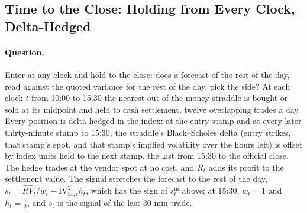 \subsection{Time to the Close: Holding from Every Clock, Delta-Hedged}
\label{sec:app_run_holdclose}

\paragraph{Question.} Enter at any clock and hold to the close: does a
forecast of the rest of the day, read against the quoted variance for the rest
of the day, pick the side? At each clock $t$ from 10:00 to 15:30 the nearest
out-of-the-money straddle is bought or sold at its midpoint and held to cash
settlement, twelve overlapping trades a day. Every position is delta-hedged in
the index: at the entry stamp and at every later thirty-minute stamp to 15:30,
the straddle's Black--Scholes delta (entry strikes, that stamp's spot, and that
stamp's implied volatility over the hours left) is offset by index units held
to the next stamp, the last from 15:30 to the official close. The hedge trades
at the vendor spot at no cost, and $R_t$ adds its profit to the settlement
value. The signal stretches the forecast to the rest of the day,
$s_t=\widehat{RV}_t/w_t-\mathrm{IV}^2_{\mathrm{hr},t}h_t$, which has the sign
of $s^{\mathrm m}_t$ above; at 15:30, $w_t=1$ and $h_t=\tfrac12$, and $s_t$ is
the signal of the last-30-min trade.

\begin{table}[H]
\centering
\caption{Holding to the close from every clock, delta-hedged, pooled over the
twelve entry clocks 10:00--15:30 (\runappHcNbars{} trades); columns as in
Table~\ref{tab:app_run_repick}. Each trade crosses the spread once, at entry.
The 15:30 leg column scores that leg alone at the crossed spread.}
\label{tab:app_run_holdclose}
\runappfit{\small}
\end{table}

\begin{table}[H]
\centering
\caption{The position against the outcome, by entry clock (midpoint, hedged
$R$). Accuracy is the share of days on which the position had the sign of
$R$: a buy with $R>0$ or a sale with $R\le 0$. The accuracy of always short is
$1-P(R>0)$. The bars with a censored implied volatility are left out.}
\label{tab:app_run_confusion}
\runappfit{\small}
\end{table}

